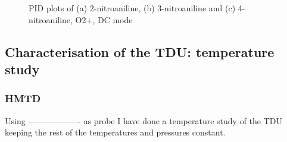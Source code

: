 \begin{figure}%
\centering
{}


\caption{PID plots of (a) 2-nitroaniline, (b) 3-nitroaniline and (c) 4-nitroaniline, O2+, DC mode}
\label{fig:na_o2_dc}
\end{figure}




\subsection{Characterisation of the TDU: temperature study}

\subsubsection{HMTD}
Using ------------------- as probe I have done a temperature study of the TDU keeping the rest of the temperatures and pressures constant.

